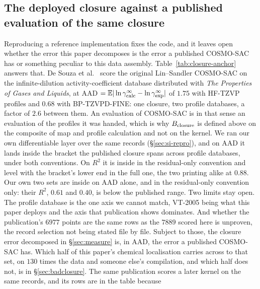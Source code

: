 \subsection{The deployed closure against a published evaluation of the same closure}
\label{sec:si-closure-anchor}
Reproducing a reference implementation fixes the code, and it leaves open whether the error this
paper decomposes is the error a published COSMO-SAC has or something peculiar to this data assembly.
Table~\ref{tab:closure-anchor} answers that. De Souza et al.\ \cite{desouza2025cosmosac} score the
original Lin--Sandler COSMO-SAC on the infinite-dilution activity-coefficient database distributed
with \emph{The Properties of Gases and Liquids}, at AAD $=\mathbb{E}|\ln\gamma_{\mathrm{calc}}^\infty
-\ln\gamma_{\mathrm{exp}}^\infty|$ of $1.75$ with HF-TZVP profiles and $0.68$ with BP-TZVPD-FINE:
one closure, two profile databases, a factor of $2.6$ between them. An evaluation of COSMO-SAC is
in that sense an evaluation of the profiles it was handed, which is why $B_{\mathrm{closure}}$ is defined above on
the composite of map and profile calculation and not on the kernel. We ran our own differentiable layer
over the same records (\S\ref{sec:si-repro}), and on AAD it lands inside the
bracket the published closure spans across profile databases, under both conventions. On $R^2$ it is
inside in the residual-only convention and level with the bracket's lower end in the full one, the two
printing alike at $0.88$. Our own two sets are inside on AAD alone, and in the residual-only
convention only: their $R^2$, $0.61$ and $0.40$, is below the published range. Two limits stay open.
The profile database is the one axis we
cannot match, VT-2005 being what this paper deploys and the axis that publication shows dominates.
And whether the publication's $6977$ points are the same rows as the $7889$ scored here is unproven,
the record selection not being stated file by file. Subject to those, the closure error decomposed
in \S\ref{sec:measure} is, in AAD, the error a published COSMO-SAC has. Which half of this paper's chemical
localisation carries across to that set, on $130$ times the data and someone else's compilation, and
which half does not, is in \S\ref{sec:badclosure}.
The same publication scores a later kernel on the same records, and its rows are in the table because
